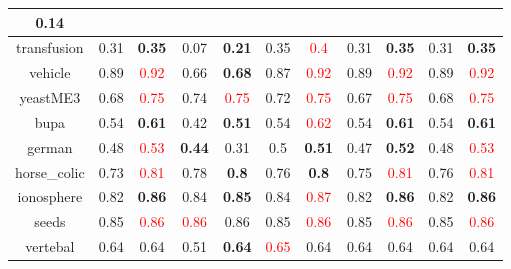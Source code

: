 \documentclass{article}%
\begin{document}
\begin{tabular}{c|cccccccccc}
{0.14
}\\%
\hline%
transfusion&0.31&\textbf{0.35}&0.07&\textbf{0.21}&0.35&\textcolor{red}{ 
0.4
}&0.31&\textbf{0.35}&0.31&\textbf{0.35}\\%
\hline%
vehicle&0.89&\textcolor{red}{ 
0.92
}&0.66&\textbf{0.68}&0.87&\textcolor{red}{ 
0.92
}&0.89&\textcolor{red}{ 
0.92
}&0.89&\textcolor{red}{ 
0.92
}\\%
\hline%
yeastME3&0.68&\textcolor{red}{ 
0.75
}&0.74&\textcolor{red}{ 
0.75
}&0.72&\textcolor{red}{ 
0.75
}&0.67&\textcolor{red}{ 
0.75
}&0.68&\textcolor{red}{ 
0.75
}\\%
\hline%
bupa&0.54&\textbf{0.61}&0.42&\textbf{0.51}&0.54&\textcolor{red}{ 
0.62
}&0.54&\textbf{0.61}&0.54&\textbf{0.61}\\%
\hline%
german&0.48&\textcolor{red}{ 
0.53
}&\textbf{0.44}&0.31&0.5&\textbf{0.51}&0.47&\textbf{0.52}&0.48&\textcolor{red}{ 
0.53
}\\%
\hline%
horse\_colic&0.73&\textcolor{red}{ 
0.81
}&0.78&\textbf{0.8}&0.76&\textbf{0.8}&0.75&\textcolor{red}{ 
0.81
}&0.76&\textcolor{red}{ 
0.81
}\\%
\hline%
ionosphere&0.82&\textbf{0.86}&0.84&\textbf{0.85}&0.84&\textcolor{red}{ 
0.87
}&0.82&\textbf{0.86}&0.82&\textbf{0.86}\\%
\hline%
seeds&0.85&\textcolor{red}{ 
0.86
}&\textcolor{red}{ 
0.86
}&0.86&0.85&\textcolor{red}{ 
0.86
}&0.85&\textcolor{red}{ 
0.86
}&0.85&\textcolor{red}{ 
0.86
}\\%
\hline%
vertebal&0.64&0.64&0.51&\textbf{0.64}&\textcolor{red}{ 
0.65
}&0.64&0.64&0.64&0.64&0.64\\%
\hline%
\end{tabular}

%
\end{document}

